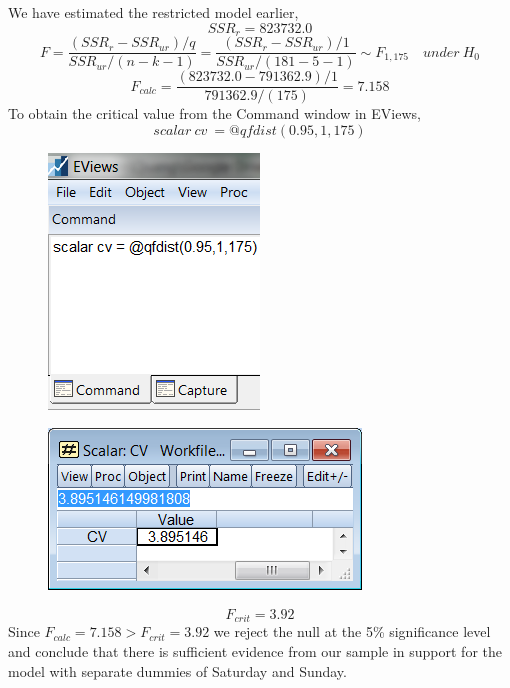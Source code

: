 \documentclass[12pt]{report}
\begin{document}
\noindent We have estimated the restricted model earlier,
$$SSR_{r} = 823732.0$$
$$F = \dfrac{(SSR_r - SSR_{ur})/q}{SSR_{ur}/(n-k-1)} = \dfrac{(SSR_r - SSR_{ur})/1}{SSR_{ur}/(181-5-1)} \sim F_{1,175} \quad under\ H_0$$
$$F_{calc} = \dfrac{(823732.0 - 791362.9)/1}{791362.9/(175)} = 7.158$$
\noindent To obtain the critical value from the Command window in EViews,
$$scalar\ cv\ = @qfdist(0.95,1,175)$$
\begin{figure}[H]
	\centerline{\includegraphics{tute10_17}}
\end{figure}
\vspace{-\baselineskip}
\begin{figure}[H]
	\centerline{\includegraphics{tute10_18}}
\end{figure}
\vspace{-\baselineskip}
$$F_{crit} = 3.92$$
\noindent Since $F_{calc} = 7.158 > F_{crit} = 3.92$ we reject the null at the 5\% significance level and conclude that there is sufficient evidence from our sample in support for the model with separate dummies of Saturday and Sunday.
\end{document}
